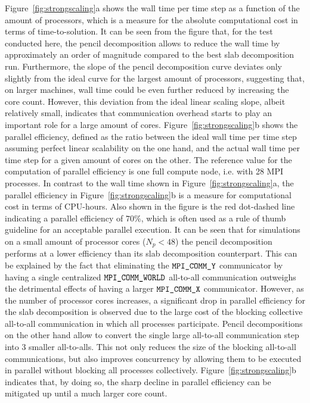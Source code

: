 Figure~\ref{fig:strongscaling}a shows the wall time per time step as a function of the amount of processors, which is a measure for the absolute computational cost in terms of time-to-solution. It can be seen from the figure that, for the test conducted here, the pencil decomposition allows to reduce the wall time by approximately an order of magnitude compared to the best slab decomposition run. Furthermore, the slope of the pencil decomposition curve deviates only slightly from the ideal curve for the largest amount of processors, suggesting that, on larger machines, wall time could be even further reduced by increasing the core count. However, this deviation from the ideal linear scaling slope, albeit relatively small, indicates that communication overhead starts to play an important role for a large amount of cores. Figure~\ref{fig:strongscaling}b shows the parallel efficiency, defined as the ratio between the ideal wall time per time step assuming perfect linear scalability on the one hand, and the actual wall time per time step for a given amount of cores on the other. The reference value for the computation of parallel efficiency is one full compute node, i.e. with 28 MPI processes. In contrast to the wall time shown in Figure~\ref{fig:strongscaling}a, the parallel efficiency in Figure~\ref{fig:strongscaling}b is a measure for computational cost in terms of CPU-hours. Also shown in the figure is the red dot-dashed line indicating a parallel efficiency of $70\%$, which is often used as a rule of thumb guideline for an acceptable parallel execution. It can be seen that for simulations on a small amount of processor cores ($N_p < 48$) the pencil decomposition performs at a lower efficiency than its slab decomposition counterpart. This can be explained by the fact that eliminating the $\verb|MPI_COMM_Y|$ communicator by having a single centralized $\verb|MPI_COMM_WORLD|$ all-to-all communication outweighs the detrimental effects of having a larger $\verb|MPI_COMM_X|$ communicator. However, as the number of processor cores increases, a significant drop in parallel efficiency for the slab decomposition is observed due to the large cost of the blocking collective all-to-all communication in which all processes participate. Pencil decompositions on the other hand allow to convert the single large all-to-all communication step into 3 smaller all-to-alls. This not only reduces the size of the blocking all-to-all communications, but also improves concurrency by allowing them to be executed in parallel without blocking all processes collectively. Figure~\ref{fig:strongscaling}b indicates that, by doing so, the sharp decline in parallel efficiency can be mitigated up until a much larger core count. 

